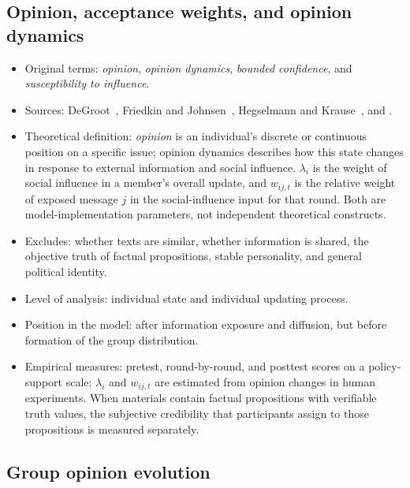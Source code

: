\documentclass[11pt,a4paper]{article}
\newcommand{\term}[1]{\textit{#1}}
\begin{document}
\subsection{Opinion, acceptance weights, and opinion dynamics}

\begin{itemize}
\item Original terms: \term{opinion}, \term{opinion dynamics}, \term{bounded confidence}, and \term{susceptibility to influence}.
\item Sources: DeGroot~\citep{degroot1974}, Friedkin and Johnsen~\citep{friedkin1990}, Hegselmann and Krause~\citep{hegselmann2002}, and \citet{perra2019}.
\item Theoretical definition: \term{opinion} is an individual's discrete or continuous position on a specific issue; opinion dynamics describes how this state changes in response to external information and social influence. $\lambda_i$ is the weight of social influence in a member's overall update, and $w_{ij,t}$ is the relative weight of exposed message $j$ in the social-influence input for that round. Both are model-implementation parameters, not independent theoretical constructs.
\item Excludes: whether texts are similar, whether information is shared, the objective truth of factual propositions, stable personality, and general political identity.
\item Level of analysis: individual state and individual updating process.
\item Position in the model: after information exposure and diffusion, but before formation of the group distribution.
\item Empirical measures: pretest, round-by-round, and posttest scores on a policy-support scale; $\lambda_i$ and $w_{ij,t}$ are estimated from opinion changes in human experiments. When materials contain factual propositions with verifiable truth values, the subjective credibility that participants assign to those propositions is measured separately.
\end{itemize}

\subsection{Group opinion evolution}
\end{document}
